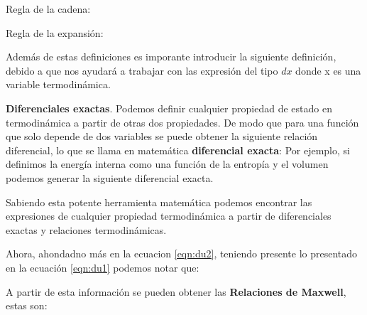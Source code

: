 
\hfill

Regla de la cadena:


Regla de la expansión:



Además de estas definiciones es imporante introducir la siguiente definición, debido a que nos ayudará a trabajar con las expresión del tipo $dx$ donde x es una variable termodinámica.

\textbf{Diferenciales exactas}. Podemos definir cualquier propiedad de estado en termodinámica a partir de otras dos propiedades. De modo que para una función que solo depende de dos variables se puede obtener la siguiente relación diferencial, lo que se llama en matemática \textbf{diferencial exacta}:
Por ejemplo, si definimos la energía interna como una función de la entropía y el volumen podemos generar la siguiente diferencial exacta.


Sabiendo esta potente herramienta matemática podemos encontrar las expresiones de cualquier propiedad termodinámica a partir de diferenciales exactas y relaciones termodinámicas.

Ahora, ahondadno más en la ecuacion \ref{eqn:du2}, teniendo presente lo presentado en la ecuación \ref{eqn:du1} podemos notar que:


A partir de esta información se pueden obtener las \textbf{Relaciones de Maxwell}, estas son:


